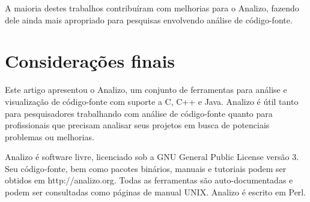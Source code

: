 \documentclass{article}
\begin{document}
A maioria destes trabalhos contribuíram com melhorias para o Analizo, fazendo
dele ainda mais apropriado para pesquisas envolvendo análise de código-fonte.

\section{Considerações finais}

Este artigo apresentou o Analizo, um conjunto de ferramentas para análise e
visualização de código-fonte com suporte a C, C++ e Java. Analizo é útil tanto
para pesquisadores trabalhando com análise de código-fonte quanto para
profissionais que precisam analisar seus projetos em busca de
potenciais problemas ou melhorias.

Analizo é software livre, licenciado sob a GNU General Public License versão 3.
Seu código-fonte, bem como pacotes binários, manuais e tutoriais podem ser
obtidos em http://analizo.org. Todas as ferramentas são auto-documentadas e
podem ser consultadas como páginas de manual UNIX. Analizo é escrito em Perl.


\appendix
\end{document}

